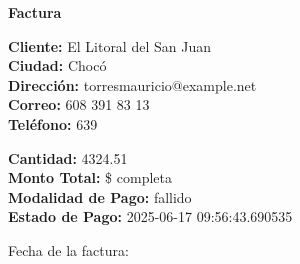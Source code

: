\documentclass{article}
\begin{document}
\begin{center}
    {\LARGE \textbf{Factura}}\\[1cm]
\end{center}

\textbf{Cliente:} El Litoral del San Juan \\
\textbf{Ciudad:} Chocó \\
\textbf{Dirección:} torresmauricio@example.net \\
\textbf{Correo:} 608 391 83 13 \\
\textbf{Teléfono:} 639 \\

\vspace{0.5cm}

\textbf{Cantidad:} 4324.51 \\
\textbf{Monto Total:} \$ completa \\
\textbf{Modalidad de Pago:} fallido \\
\textbf{Estado de Pago:} 2025-06-17 09:56:43.690535 \\

\vspace{1cm}

Fecha de la factura: 
\end{document}
